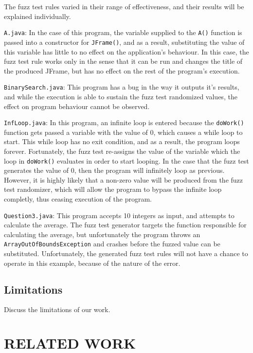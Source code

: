 \documentclass[letterpaper,twocolumn,10pt]{article}
\begin{document}
The fuzz test rules varied in their range of effectiveness, and their results will be explained individually.

{\tt A.java}: In the case of this program, the variable supplied to the {\tt A()} function is passed into a constructor for {\tt JFrame()}, and as a result, substituting the value of this variable has little to no effect on the application's behaviour. In this case, the fuzz test rule works only in the sense that it can be run and changes the title of the produced JFrame, but has no effect on the rest of the program's execution.

{\tt BinarySearch.java}: This program has a bug in the way it outputs it's results, and while the execution is able to sustain the fuzz test randomized values, the effect on program behaviour cannot be observed.

{\tt InfLoop.java}: In this program, an infinite loop is entered because the {\tt doWork()} function gets passed a variable with the value of 0, which causes a while loop to start. This while loop has no exit condition, and as a result, the program loops forever. Fortunately, the fuzz test re-assigns the value of the variable which the loop in {\tt doWork()} evaluates in order to start looping. In the case that the fuzz test generates the value of 0, then the program will infinitely loop as previous. However, it is highly likely that a non-zero value will be produced from the fuzz test randomizer, which will allow the program to bypass the infinite loop completly, thus ceasing execution of the program.

{\tt Question3.java}: This program accepts 10 integers as input, and attempts to calculate the average. The fuzz test generator targets the function responsible for calculating the average, but unfortunately the program throws an {\tt ArrayOutOfBoundsException} and crashes before the fuzzed value can be substituted. Unfortunately, the generated fuzz test rules will not have a chance to operate in this example, because of the nature of the error.

\subsection{Limitations}

Discuss the limitations of our work.

\section{RELATED WORK}
\end{document}
